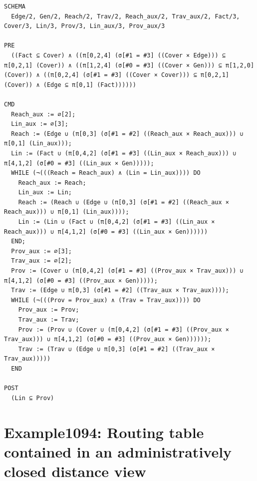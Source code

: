 \documentclass[10pt]{article}
\begin{document}
\begin{Verbatim}[fontsize=\scriptsize,breaklines=true,breakanywhere=true,frame=single,framesep=1.5mm]
SCHEMA
  Edge/2, Gen/2, Reach/2, Trav/2, Reach_aux/2, Trav_aux/2, Fact/3, Cover/3, Lin/3, Prov/3, Lin_aux/3, Prov_aux/3

PRE
  ((Fact ⊆ Cover) ∧ ((π[0,2,4] (σ[#1 = #3] ((Cover × Edge))) ⊆ π[0,2,1] (Cover)) ∧ ((π[1,2,4] (σ[#0 = #3] ((Cover × Gen))) ⊆ π[1,2,0] (Cover)) ∧ ((π[0,2,4] (σ[#1 = #3] ((Cover × Cover))) ⊆ π[0,2,1] (Cover)) ∧ (Edge ⊆ π[0,1] (Fact))))))

CMD
  Reach_aux := ∅[2];
  Lin_aux := ∅[3];
  Reach := (Edge ∪ (π[0,3] (σ[#1 = #2] ((Reach_aux × Reach_aux))) ∪ π[0,1] (Lin_aux)));
  Lin := (Fact ∪ (π[0,4,2] (σ[#1 = #3] ((Lin_aux × Reach_aux))) ∪ π[4,1,2] (σ[#0 = #3] ((Lin_aux × Gen)))));
  WHILE (¬(((Reach = Reach_aux) ∧ (Lin = Lin_aux)))) DO
    Reach_aux := Reach;
    Lin_aux := Lin;
    Reach := (Reach ∪ (Edge ∪ (π[0,3] (σ[#1 = #2] ((Reach_aux × Reach_aux))) ∪ π[0,1] (Lin_aux))));
    Lin := (Lin ∪ (Fact ∪ (π[0,4,2] (σ[#1 = #3] ((Lin_aux × Reach_aux))) ∪ π[4,1,2] (σ[#0 = #3] ((Lin_aux × Gen))))))
  END;
  Prov_aux := ∅[3];
  Trav_aux := ∅[2];
  Prov := (Cover ∪ (π[0,4,2] (σ[#1 = #3] ((Prov_aux × Trav_aux))) ∪ π[4,1,2] (σ[#0 = #3] ((Prov_aux × Gen)))));
  Trav := (Edge ∪ π[0,3] (σ[#1 = #2] ((Trav_aux × Trav_aux))));
  WHILE (¬(((Prov = Prov_aux) ∧ (Trav = Trav_aux)))) DO
    Prov_aux := Prov;
    Trav_aux := Trav;
    Prov := (Prov ∪ (Cover ∪ (π[0,4,2] (σ[#1 = #3] ((Prov_aux × Trav_aux))) ∪ π[4,1,2] (σ[#0 = #3] ((Prov_aux × Gen))))));
    Trav := (Trav ∪ (Edge ∪ π[0,3] (σ[#1 = #2] ((Trav_aux × Trav_aux)))))
  END

POST
  (Lin ⊆ Prov)
\end{Verbatim}

\Needspace{0.45\textheight}

\section{Example1094: Routing table contained in an administratively closed distance view}\label{case:Example1094}
\end{document}
